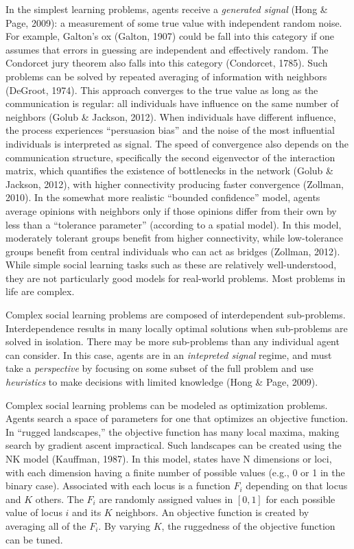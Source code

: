In the simplest learning problems, agents receive a {\em generated signal} (Hong \& Page, 2009): a measurement of some true value with independent random noise. For example, Galton's ox (Galton, 1907) could be fall into this category if one assumes that errors in guessing are independent and effectively random. The Condorcet jury theorem also falls into this category (Condorcet, 1785). Such problems can be solved by repeated averaging of information with neighbors (DeGroot, 1974). This approach converges to the true value as long as the communication is regular: all individuals have influence on the same number of neighbors (Golub \& Jackson, 2012). When individuals have different influence, the process experiences ``persuasion bias'' and the noise of the most influential individuals is interpreted as signal. The speed of convergence also depends on the communication structure, specifically the second eigenvector of the interaction matrix, which quantifies the existence of bottlenecks in the network (Golub \& Jackson, 2012), with higher connectivity producing faster convergence (Zollman, 2010). In the somewhat more realistic ``bounded confidence'' model, agents average opinions with neighbors only if those opinions differ from their own by less than a ``tolerance parameter'' (according to a spatial model). In this model, moderately tolerant groups benefit from higher connectivity, while low-tolerance groups benefit from central individuals who can act as bridges (Zollman, 2012). While simple social learning tasks such as these are relatively well-understood, they are not particularly good models for real-world problems. Most problems in life are complex.

Complex social learning problems are composed of interdependent sub-problems.
Interdependence results in many locally optimal solutions when sub-problems are
solved in isolation.
There may be more sub-problems than any individual agent can consider.
In this case, agents are in an {\em intepreted signal} regime, and must take a {\em perspective} by focusing on some subset of the full
problem and use {\em heuristics} to make decisions with limited knowledge (Hong \& Page, 2009).

Complex social learning problems can be modeled as optimization problems. Agents search a space of parameters for one that optimizes an objective function. In ``rugged landscapes,'' the objective function has many local maxima, making search by gradient ascent impractical. Such landscapes can be created using the NK model (Kauffman, 1987). In this model, states have N dimensions or loci, with each dimension having a finite number of possible values (e.g., 0 or 1 in the binary case). Associated with each locus is a function $F_i$ depending on that locus and $K$ others. The $F_i$ are randomly assigned values in $[0,1]$ for each possible value of locus $i$ and its $K$ neighbors. An objective function is created by averaging all of the $F_i$. By varying $K$, the ruggedness of the objective function can be tuned.

